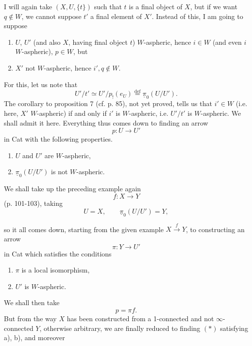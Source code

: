 \setcounter{footnote}{76}



I will again take $(X,U,\{t\})$ such that $t$ is a final object of $X$, but if we want $q\notin W$, we cannot suppose $t'$ a final element of $X'$. Instead of this, I am going to suppose

\begin{enumerate}[label=\alph*)]
\item $U$, $U'$ (and also $X$, having final object $t$) $W$-aspheric, hence $i\in W$ (and even $i$ $W$-aspheric), $p\in W$, but
\item $X'$ not $W$-aspheric, hence $i',q\notin W$.
\end{enumerate}

For this, let us note that
\[ U'/t'\simeq U'/p_!(e_U)\overset{\text{def}}{=}\underline{\pi}_0(U/U'). \]
The corollary to proposition 7 (cf. p. 85), not yet proved, tells us that $i'\in W$ (i.e. here, $X'$ $W$-aspheric) if and only if $i'$ is $W$-aspheric, i.e. $U'/t'$ is $W$-aspheric. We shall admit it here. Everything thus comes down to finding an arrow
\[ p:U\longrightarrow U' \]
in Cat with the following properties.

\begin{enumerate}[label=\alph*)]
\item $U$ and $U'$ are $W$-aspheric,
\item $\underline{\pi}_0(U/U')$ is not $W$-aspheric.
\end{enumerate}

We shall take up the preceding example again
\[ f:X\longrightarrow Y \]
(p. 101-103), taking
\[ U=X,\qquad \underline{\pi}_0(U/U')=Y, \]


so it all comes down, starting from the given example $X\xrightarrow{f}Y$, to constructing an arrow
\[ \pi:Y\longrightarrow U' \tag*{$(*)$} \]
in Cat which satisfies the conditions

\begin{enumerate}[label=\alph*)]
\item $\pi$ is a local isomorphism,
\item $U'$ is $W$-aspheric.
\end{enumerate}

We shall then take
\[ p=\pi f. \]
But from the way $X$ has been constructed from a 1-connected and not $\infty$-connected $Y$, otherwise arbitrary, we are finally reduced to finding $(*)$ satisfying a), b), and moreover

